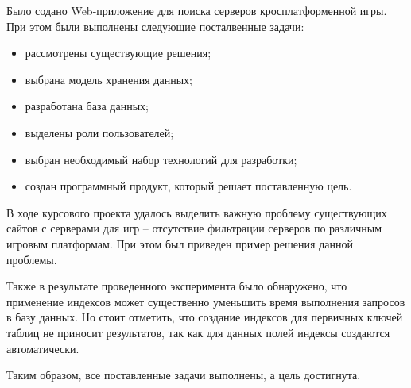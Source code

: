 \conclusion

Было содано Web-приложение для поиска серверов кросплатформенной игры. При этом были выполнены следующие посталвенные задачи:

\begin{itemize}
	\item рассмотрены существующие решения;
	\item выбрана модель хранения данных;
	\item разработана база данных;
	\item выделены роли пользователей;
	\item выбран необходимый набор технологий для разработки;
	\item создан программный продукт, который решает поставленную цель.
\end{itemize}

В ходе курсового проекта удалось выделить важную проблему существующих сайтов с серверами для игр -- отсутствие фильтрации серверов по различным игровым платформам. При этом был приведен пример решения данной проблемы.

Также в результате проведенного эксперимента было обнаружено, что применение индексов может существенно уменьшить время выполнения запросов в базу данных. Но стоит отметить, что создание индексов для первичных ключей таблиц не приносит результатов, так как для данных полей индексы создаются автоматически.

Таким образом, все поставленные задачи выполнены, а цель достигнута.
